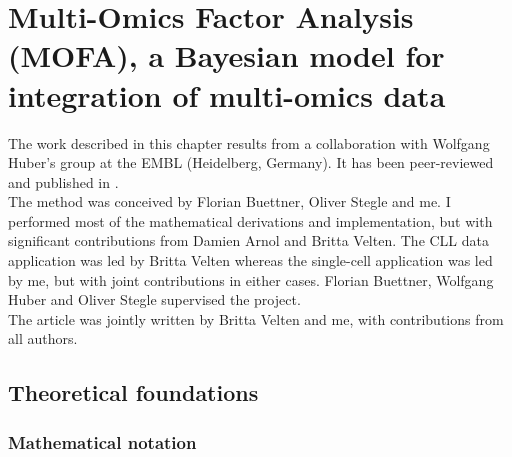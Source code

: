 \graphicspath{{Chapter2/Figs/}}

\chapter{Multi-Omics Factor Analysis (MOFA), a Bayesian model for integration of multi-omics data}

The work described in this chapter results from a collaboration with Wolfgang Huber's group at the EMBL (Heidelberg, Germany). It has been peer-reviewed and published in \cite{Argelaguet2018}.\\
The method was conceived by Florian Buettner, Oliver Stegle and me. I performed most of the mathematical derivations and implementation, but with significant contributions from Damien Arnol and Britta Velten. The CLL data application was led by Britta Velten whereas the single-cell application was led by me, but with joint contributions in either cases. Florian Buettner, Wolfgang Huber and Oliver Stegle supervised the project.\\
The article was jointly written by Britta Velten and me, with contributions from all authors.

\section{Theoretical foundations}

\subsection{Mathematical notation} \label{section:mathematical_notation}

